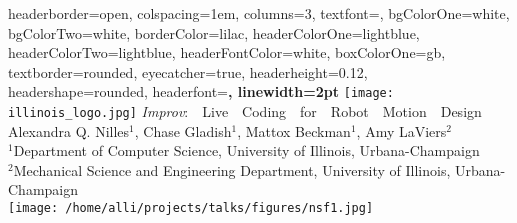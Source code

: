 \documentclass[landscape,a0paper,fontscale=0.3]{baposter} %
\begin{document}
\begin{poster}
{
headerborder=open, %
colspacing=1em, %
columns=3,
textfont=\Large,
bgColorOne=white, %
bgColorTwo=white, %
borderColor=lilac, %
headerColorOne=lightblue, %
headerColorTwo=lightblue, %
headerFontColor=white, %
boxColorOne=gb, %
textborder=rounded, %
eyecatcher=true, %
headerheight=0.12\textheight, %
headershape=rounded, %
headerfont=\Large\bf\textsc, %
linewidth=2pt %
}
%
{\texttt{[image: illinois\_logo.jpg]}} %
{\emph{Improv}:~~Live~~Coding~~for~~Robot~~Motion~~Design \vspace{-0.0em}} %
{Alexandra Q. Nilles$^1$, Chase Gladish$^1$, Mattox Beckman$^1$, Amy LaViers$^2$ \\
$^1$Department of Computer Science, University of Illinois, Urbana-Champaign \\
$^2$Mechanical Science and Engineering Department, University of Illinois, Urbana-Champaign \\
} %
{\texttt{[image: /home/alli/projects/talks/figures/nsf1.jpg]}} %


\end{poster}
\end{document}

